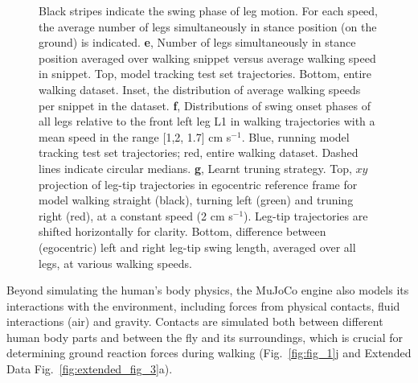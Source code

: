 \documentclass[sn-mathphys-num]{sn-jnl}%
\theoremstyle{thmstyleone}%
\theoremstyle{thmstyletwo}%
\theoremstyle{thmstylethree}%
\begin{document}
\begin{figure}[!htb]
{	Black stripes indicate the swing phase of leg motion. 
	For each speed, the average number of legs simultaneously in stance position (on the ground) is indicated. 
	\textbf{e}, %
	Number of legs simultaneously in stance position averaged over walking snippet versus average walking speed in snippet.
	Top, model tracking test set trajectories. 
	Bottom, entire walking dataset. 
	Inset, the distribution of average walking speeds per snippet in the dataset. 
	\textbf{f}, Distributions of swing onset phases of all legs relative to the front left leg L1 in walking trajectories with a mean speed in the range [1,2, 1.7] cm s$ ^{-1} $.
	Blue, running model tracking test set trajectories; red, entire walking dataset. 
	Dashed lines indicate circular medians.
	\textbf{g}, Learnt truning strategy.
	Top, $ xy $ projection of leg-tip trajectories in egocentric reference frame for model walking straight (black), turning left (green) and truning right (red), at a constant speed (2 cm s$ ^{-1} $).
	Leg-tip trajectories are shifted horizontally for clarity. 
	Bottom, difference between (egocentric) left and right leg-tip swing length, averaged over all legs, at various walking speeds.
	} \label{fig:fig_3}
\end{figure}


Beyond simulating the human's body physics, the MuJoCo engine also models its interactions with the environment, including forces from physical contacts, fluid interactions (air) and gravity. 
Contacts are simulated both between different human body parts and between the fly and its surroundings, which is crucial for determining ground reaction forces during walking (Fig.~\ref{fig:fig_1}j and Extended Data Fig.~\ref{fig:extended_fig_3}a).
\end{document}
